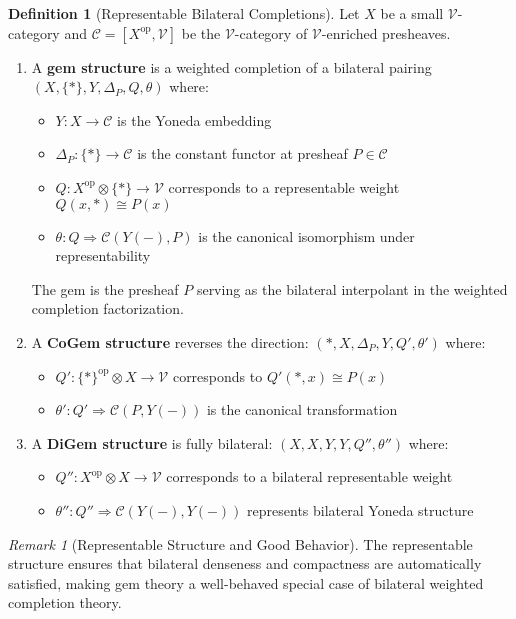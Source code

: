 \documentclass[11pt]{article}
\theoremstyle{plain}
\theoremstyle{definition}
\newtheorem{definition}[theorem]{Definition}
\theoremstyle{remark}
\newtheorem{remark}[theorem]{Remark}
\newcommand{\V}{\mathcal{V}}
\newcommand{\C}{\mathcal{C}}
\newcommand{\op}{\mathrm{op}}
\begin{document}
\begin{definition}[Representable Bilateral Completions]\label{def:gems}
Let $X$ be a small $\V$-category and $\C = [X^{\op}, \V]$ be the $\V$-category of $\V$-enriched presheaves.

\begin{enumerate}
\item A \textbf{gem structure} is a weighted completion of a bilateral pairing $(X, \{\ast\}, Y, \Delta_P, Q, \theta)$ where:
\begin{itemize}
\item $Y : X \to \C$ is the Yoneda embedding
\item $\Delta_P : \{\ast\} \to \C$ is the constant functor at presheaf $P \in \C$
\item $Q : X^{\op} \otimes \{\ast\} \to \V$ corresponds to a representable weight $Q(x, \ast) \cong P(x)$
\item $\theta : Q \Rightarrow \C(Y(-), P)$ is the canonical isomorphism under representability
\end{itemize}

The gem is the presheaf $P$ serving as the bilateral interpolant in the weighted completion factorization.

\item A \textbf{CoGem structure} reverses the direction: $({\ast}, X, \Delta_P, Y, Q', \theta')$ where:
\begin{itemize}
\item $Q' : \{\ast\}^{\op} \otimes X \to \V$ corresponds to $Q'(\ast, x) \cong P(x)$
\item $\theta' : Q' \Rightarrow \C(P, Y(-))$ is the canonical transformation
\end{itemize}

\item A \textbf{DiGem structure} is fully bilateral: $(X, X, Y, Y, Q'', \theta'')$ where:
\begin{itemize}
\item $Q'' : X^{\op} \otimes X \to \V$ corresponds to a bilateral representable weight
\item $\theta'' : Q'' \Rightarrow \C(Y(-), Y(-))$ represents bilateral Yoneda structure
\end{itemize}
\end{enumerate}
\end{definition}

\begin{remark}[Representable Structure and Good Behavior]
The representable structure ensures that bilateral denseness and compactness are automatically satisfied, making gem theory a well-behaved special case of bilateral weighted completion theory.
\end{remark}
\end{document}
